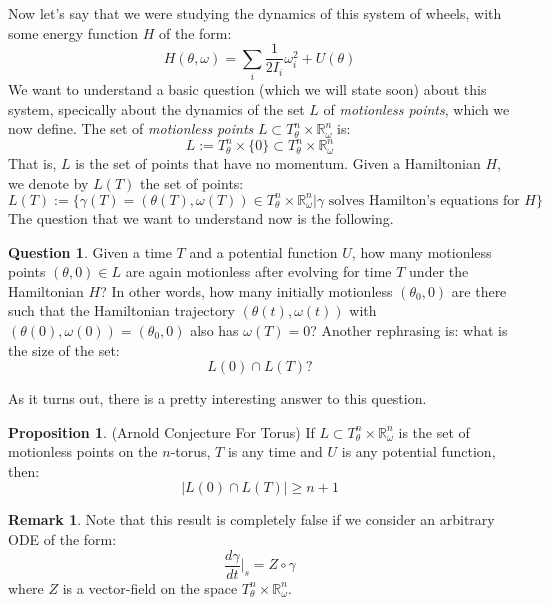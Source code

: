 \documentclass[12pt]{article}
\theoremstyle{definition}
\newtheorem{proposition}[theorem]{Proposition}
\newtheorem{remark}[theorem]{Remark}
\newtheorem{question}[theorem]{Question}
\numberwithin{equation}{section}
\newcommand{\R}{{\mathbb R}}
\begin{document}
Now let's say that we were studying the dynamics of this system of wheels, with some energy function $H$ of the form:
\[
H(\theta,\omega) = \sum_i \frac{1}{2 I_i}\omega_i^2 + U(\theta)
\]
We want to understand a basic question (which we will state soon) about this system, specically about the dynamics of the set $L$ of \emph{motionless points}, which we now define. The set of \emph{motionless points} $L \subset T^n_\theta \times \R^n_\omega$ is:
\[
L := T^n_\theta \times \{0\} \subset T^n_\theta \times \R^n_\omega
\]
That is, $L$ is the set of points that have no momentum. Given a Hamiltonian $H$, we denote by $L(T)$ the set of points:
\[
L(T) := \{\gamma(T) = (\theta(T),\omega(T)) \in T^n_\theta \times \R^n_\omega|\gamma \text{ solves Hamilton's equations for $H$}\}
\]
The question that we want to understand now is the following.

\begin{question} Given a time $T$ and a potential function $U$, how many motionless points $(\theta,0) \in L$ are again motionless after evolving for time $T$ under the Hamiltonian $H$? In other words, how many initially motionless $(\theta_0,0)$ are there such that the Hamiltonian trajectory $(\theta(t),\omega(t))$ with $(\theta(0),\omega(0)) = (\theta_0,0)$ also has $\omega(T) = 0$? Another rephrasing is: what is the size of the set:
\[
L(0) \cap L(T) \text{?}
\]
\end{question}

As it turns out, there is a pretty interesting answer to this question.

\begin{proposition} (Arnold Conjecture For Torus) If $L \subset T^n_\theta \times \R^n_\omega$ is the set of motionless points on the $n$-torus, $T$ is any time and $U$ is any potential function, then:
\[
|L(0) \cap L(T)| \ge n + 1
\]
\end{proposition}

\begin{remark} Note that this result is completely false if we consider an arbitrary ODE of the form:
\[
\frac{d\gamma}{dt}|_s = Z \circ \gamma
\]
where $Z$ is a vector-field on the space $T^n_\theta \times \R^n_\omega$. 
\end{remark}
\end{document}
